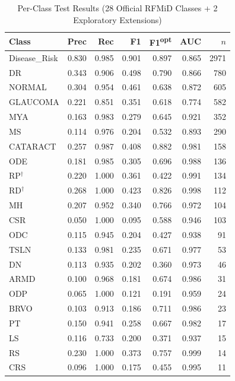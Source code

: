 \documentclass[conference]{IEEEtran}
\begin{document}
\begin{table}[htbp]
\centering
\caption{Per-Class Test Results (28 Official RFMiD Classes + 2 Exploratory Extensions)}
\label{tab:perclass}
\setlength{\tabcolsep}{4pt}
\begin{tabular}{lrrrrrr}
\toprule
Class & Prec & Rec & F1 & F1\textsuperscript{opt} & AUC & $n$ \\
\midrule
Disease\_Risk & 0.830 & 0.985 & 0.901 & 0.897 & 0.865 & 2971 \\
DR            & 0.343 & 0.906 & 0.498 & 0.790 & 0.866 & 780 \\
NORMAL        & 0.304 & 0.954 & 0.461 & 0.638 & 0.872 & 605 \\
GLAUCOMA      & 0.221 & 0.851 & 0.351 & 0.618 & 0.774 & 582 \\
MYA           & 0.163 & 0.983 & 0.279 & 0.645 & 0.921 & 352 \\
MS            & 0.114 & 0.976 & 0.204 & 0.532 & 0.893 & 290 \\
CATARACT      & 0.257 & 0.987 & 0.408 & 0.882 & 0.981 & 158 \\
ODE           & 0.181 & 0.985 & 0.305 & 0.696 & 0.988 & 136 \\
RP$^\dagger$  & 0.220 & 1.000 & 0.361 & 0.422 & 0.991 & 134 \\
RD$^\dagger$  & 0.268 & 1.000 & 0.423 & 0.826 & 0.998 & 112 \\
MH            & 0.207 & 0.952 & 0.340 & 0.766 & 0.972 & 104 \\
CSR           & 0.050 & 1.000 & 0.095 & 0.588 & 0.946 & 103 \\
ODC           & 0.115 & 0.945 & 0.204 & 0.427 & 0.938 & 91  \\
TSLN          & 0.133 & 0.981 & 0.235 & 0.671 & 0.977 & 53  \\
DN            & 0.113 & 0.935 & 0.202 & 0.360 & 0.973 & 46  \\
ARMD          & 0.100 & 0.968 & 0.181 & 0.674 & 0.986 & 31  \\
ODP           & 0.065 & 1.000 & 0.121 & 0.191 & 0.959 & 24  \\
BRVO          & 0.103 & 0.913 & 0.186 & 0.711 & 0.986 & 23  \\
PT            & 0.150 & 0.941 & 0.258 & 0.667 & 0.982 & 17  \\
LS            & 0.116 & 0.733 & 0.200 & 0.371 & 0.937 & 15  \\
RS            & 0.230 & 1.000 & 0.373 & 0.757 & 0.999 & 14  \\
CRS           & 0.096 & 1.000 & 0.175 & 0.455 & 0.995 & 11  \\

\end{tabular}
\end{table}
\end{document}
